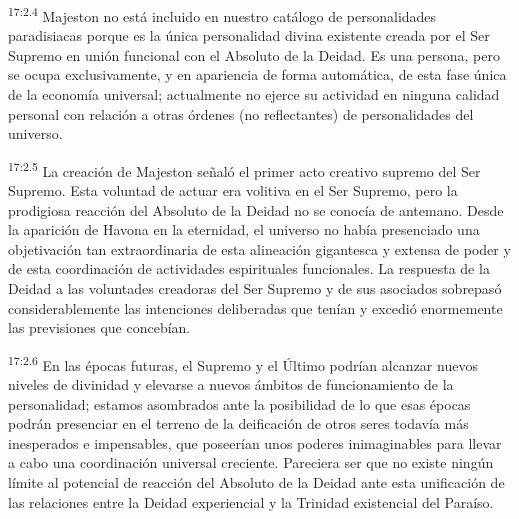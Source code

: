 \par
\textsuperscript{17:2.4} Majeston no está incluido en nuestro catálogo de personalidades paradisiacas porque es la única personalidad divina existente creada por el Ser Supremo en unión funcional con el Absoluto de la Deidad. Es una persona, pero se ocupa exclusivamente, y en apariencia de forma automática, de esta fase única de la economía universal; actualmente no ejerce su actividad en ninguna calidad personal con relación a otras órdenes (no reflectantes) de personalidades del universo.

\par
\textsuperscript{17:2.5} La creación de Majeston señaló el primer acto creativo supremo del Ser Supremo. Esta voluntad de actuar era volitiva en el Ser Supremo, pero la prodigiosa reacción del Absoluto de la Deidad no se conocía de antemano. Desde la aparición de Havona en la eternidad, el universo no había presenciado una objetivación tan extraordinaria de esta alineación gigantesca y extensa de poder y de esta coordinación de actividades espirituales funcionales. La respuesta de la Deidad a las voluntades creadoras del Ser Supremo y de sus asociados sobrepasó considerablemente las intenciones deliberadas que tenían y excedió enormemente las previsiones que concebían.

\par
\textsuperscript{17:2.6} En las épocas futuras, el Supremo y el Último podrían alcanzar nuevos niveles de divinidad y elevarse a nuevos ámbitos de funcionamiento de la personalidad; estamos asombrados ante la posibilidad de lo que esas épocas podrán presenciar en el terreno de la deificación de otros seres todavía más inesperados e impensables, que poseerían unos poderes inimaginables para llevar a cabo una coordinación universal creciente. Pareciera ser que no existe ningún límite al potencial de reacción del Absoluto de la Deidad ante esta unificación de las relaciones entre la Deidad experiencial y la Trinidad existencial del Paraíso.

